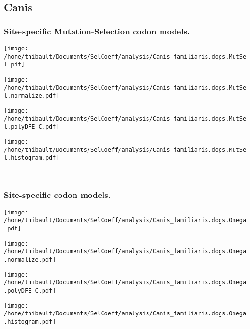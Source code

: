 \subsection{Canis} 
 
\subsubsection*{Site-specific Mutation-Selection codon models.} 
\begin{minipage}{0.49\linewidth} 
\texttt{[image: /home/thibault/Documents/SelCoeff/analysis/Canis\_familiaris.dogs.MutSel.pdf]} 
\end{minipage}
\begin{minipage}{0.49\linewidth} 
\texttt{[image: /home/thibault/Documents/SelCoeff/analysis/Canis\_familiaris.dogs.MutSel.normalize.pdf]} 
\end{minipage}
\begin{minipage}{0.49\linewidth} 
\texttt{[image: /home/thibault/Documents/SelCoeff/analysis/Canis\_familiaris.dogs.MutSel.polyDFE\_C.pdf]} 
\end{minipage}
\begin{minipage}{0.49\linewidth} 
\texttt{[image: /home/thibault/Documents/SelCoeff/analysis/Canis\_familiaris.dogs.MutSel.histogram.pdf]} 
\end{minipage}
\\ 
\subsubsection*{Site-specific codon models.} 
\begin{minipage}{0.49\linewidth} 
\texttt{[image: /home/thibault/Documents/SelCoeff/analysis/Canis\_familiaris.dogs.Omega.pdf]} 
\end{minipage}
\begin{minipage}{0.49\linewidth} 
\texttt{[image: /home/thibault/Documents/SelCoeff/analysis/Canis\_familiaris.dogs.Omega.normalize.pdf]} 
\end{minipage}
\begin{minipage}{0.49\linewidth} 
\texttt{[image: /home/thibault/Documents/SelCoeff/analysis/Canis\_familiaris.dogs.Omega.polyDFE\_C.pdf]} 
\end{minipage}
\begin{minipage}{0.49\linewidth} 
\texttt{[image: /home/thibault/Documents/SelCoeff/analysis/Canis\_familiaris.dogs.Omega.histogram.pdf]} 
\end{minipage}
\\ 
